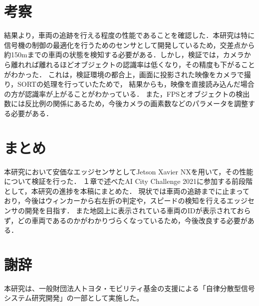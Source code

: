 \documentclass[technicalreport]{ieicej}
\begin{document}
\section{考察}
結果より，車両の追跡を行える程度の性能であることを確認した．本研究は特に信号機の制御の最適化を行うためのセンサとして開発しているため，交差点から
約150mまでの車両の状態を検知する必要がある．しかし，検証では，カメラから離れれば離れるほどオブジェクトの認識率は低くなり，その精度も下がることがわかった．
これは，検証環境の都合上，画面に投影された映像をカメラで撮り，SORTの処理を行っていたためで，
結果からも，映像を直接読み込んだ場合の方が認識率が上がることがわかっている．
また，FPSとオブジェクトの検出数には反比例の関係にあるため，今後カメラの画素数などのパラメータを調整する必要がある．

\section{まとめ}
本研究において安価なエッジセンサとしてJetson Xavier NXを用いて，その性能について検証を行った．
１章で述べたAI City Challenge 2021に参加する前段階として，本研究の進捗を本稿にまとめた．
現状では車両の追跡までに止まっており，今後はウィンカーから右左折の判定や，スピードの検知を行えるエッジセンサの開発を目指す．
また地図上に表示されている車両のIDが表示されておらず，どの車両であるのかがわかりづらくなっているため，今後改良する必要がある．

\section*{謝辞}
本研究は、一般財団法人トヨタ・モビリティ基金の支援による「自律分散型信号システム研究開発」の一部として実施した。

\end{document}
